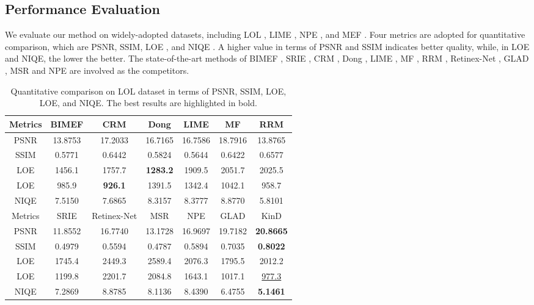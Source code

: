\documentclass[journal,10pt,compsoc]{IEEEtran}
\begin{document}
\subsection{Performance Evaluation}
We evaluate our method on widely-adopted datasets, including LOL \cite{DRD}, LIME \cite{LIME}, NPE \cite{NPE}, and MEF \cite{MEF}. Four metrics are adopted for quantitative comparison, which are PSNR, SSIM, LOE \cite{NPE}, and NIQE \cite{NIQE}. A higher value in terms of PSNR and SSIM indicates better quality, while, in LOE and NIQE, the lower the better. The state-of-the-art methods of BIMEF \cite{BIMEF}, SRIE \cite{SRIE}, CRM \cite{CRM}, Dong \cite{Dong}, LIME \cite{LIME}, MF \cite{MF}, RRM \cite{RRM}, Retinex-Net \cite{DRD}, GLAD \cite{GLAD}, MSR \cite{MSR} and NPE \cite{NPE} are involved as the competitors. 

\begin{table*}[t]
	\centering
\begin{tabular}{c|cccccc}
		\hline
		Metrics &BIMEF \cite{BIMEF} & CRM \cite{CRM} & Dong \cite{Dong} & LIME \cite{LIME} & MF \cite{MF} & RRM \cite{RRM}  \\ 
		\hline
		PSNR   & 13.8753 & 17.2033 & 16.7165 & 16.7586 & 18.7916 & 13.8765  \\
		SSIM   & 0.5771  & 0.6442  & 0.5824  & 0.5644  & 0.6422  & 0.6577 \\
		LOE    & 1456.1  & 1757.7  & \textbf{1283.2}  & 1909.5  & 2051.7  & 2025.5 \\
		LOE    & 985.9  & \textbf{926.1}  & 1391.5  & 1342.4  & 1042.1  & 958.7 \\
		NIQE   & 7.5150  & 7.6865  & 8.3157  & 8.3777  & 8.8770  & 5.8101 \\
		\hline
		Metrics & SRIE \cite{SRIE} & Retinex-Net \cite{DRD} & MSR \cite{MSR} & NPE \cite{NPE} & GLAD \cite{GLAD} & KinD \\
		\hline
		PSNR   & 11.8552 & 16.7740 & 13.1728 & 16.9697 & 19.7182 & \textbf{20.8665} \\
		SSIM   & 0.4979  & 0.5594  & 0.4787  & 0.5894  & 0.7035  & \textbf{0.8022}  \\
		LOE    & 1745.4  & 2449.3  & 2589.4  & 2076.3  & 1795.5  & 2012.2 \\
		LOE    & 1199.8  & 2201.7  & 2084.8  & 1643.1  & 1017.1  & \underline{977.3} \\
		NIQE   & 7.2869  & 8.8785  & 8.1136  & 8.4390  & 6.4755  & \textbf{5.1461} \\      
		
		\hline
	\end{tabular}
\vspace{10pt}
	\caption{Quantitative comparison on LOL dataset in terms of PSNR, SSIM, LOE, LOE, and NIQE. The best results are highlighted in bold.}
\label{tab:LOL}
\end{table*}
\end{document}
